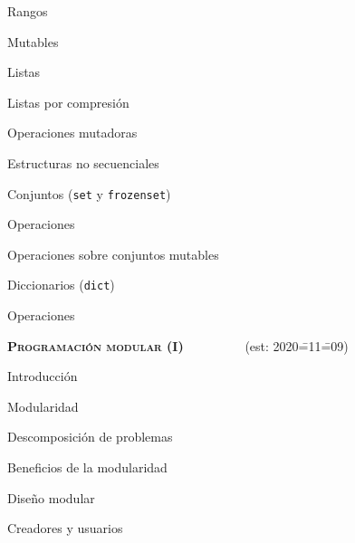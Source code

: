 \begin{longenum}
\begin{longenum}
\begin{longenum}
\begin{longenum}
                \item Rangos
            \end{longenum}
            \item Mutables
            \begin{longenum}
                \item Listas
                \begin{longenum}
                    \item Listas por compresión
                \end{longenum}
                \item Operaciones mutadoras
            \end{longenum}
        \end{longenum}
        \item Estructuras no secuenciales
        \begin{longenum}
            \item Conjuntos (\texttt{set} y \texttt{frozenset})
            \begin{longenum}
                \item Operaciones
                \item Operaciones sobre conjuntos mutables
            \end{longenum}
            \item Diccionarios (\texttt{dict})
            \begin{longenum}
                \item Operaciones
            \end{longenum}
        \end{longenum}
    \end{longenum}
    \item \textbf{\textsc{Programación modular (I)}} \ \ \ \ \ \ \ \ \ (est: 2020\==11\==09)
    \begin{longenum}
        \item Introducción
        \begin{longenum}
            \item Modularidad
            \item Descomposición de problemas
            \item Beneficios de la modularidad
        \end{longenum}
        \item Diseño modular
        \begin{longenum}
            \item Creadores y usuarios

\end{longenum}
\end{longenum}
\end{longenum}
